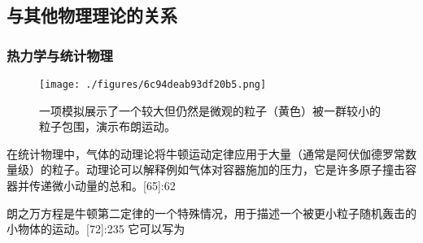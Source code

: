 \subsection{与其他物理理论的关系}
\subsubsection{热力学与统计物理}
\begin{figure}[ht]
\centering
\texttt{[image: ./figures/6c94deab93df20b5.png]}
\caption{一项模拟展示了一个较大但仍然是微观的粒子（黄色）被一群较小的粒子包围，演示布朗运动。} \label{fig_NEW01_12}
\end{figure}
在统计物理中，气体的动理论将牛顿运动定律应用于大量（通常是阿伏伽德罗常数量级）的粒子。动理论可以解释例如气体对容器施加的压力，它是许多原子撞击容器并传递微小动量的总和。[65]:62

朗之万方程是牛顿第二定律的一个特殊情况，用于描述一个被更小粒子随机轰击的小物体的运动。[72]:235 它可以写为
